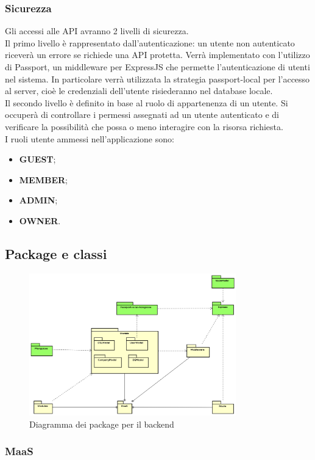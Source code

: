 \subsubsection{Sicurezza}
Gli accessi alle API avranno 2 livelli di sicurezza. \\
Il primo livello è rappresentato dall'autenticazione: un utente non autenticato riceverà un errore se richiede una API protetta. Verrà implementato con l'utilizzo di Passport, un middleware per ExpressJS che permette l'autenticazione di utenti nel sistema. In particolare verrà utilizzata la strategia passport-local per l'accesso al server, cioè le credenziali dell'utente risiederanno nel database locale. \\
Il secondo livello è definito in base al ruolo di appartenenza di un utente. Si occuperà di controllare i permessi assegnati ad un utente autenticato e di verificare la possibilità che possa o meno interagire con la risorsa richiesta. \\
I ruoli utente ammessi nell'applicazione sono: 
\begin{itemize}
\item \textbf{GUEST};
\item \textbf{MEMBER};
\item \textbf{ADMIN};
\item \textbf{OWNER}.
\end{itemize}
\subsection{Package e classi}
\begin{figure}[h]
\centering
\includegraphics[width=0.8\textwidth]{res/sections/package.png}
\caption{Diagramma dei package per il backend}
\end{figure}
\subsubsection{MaaS}
